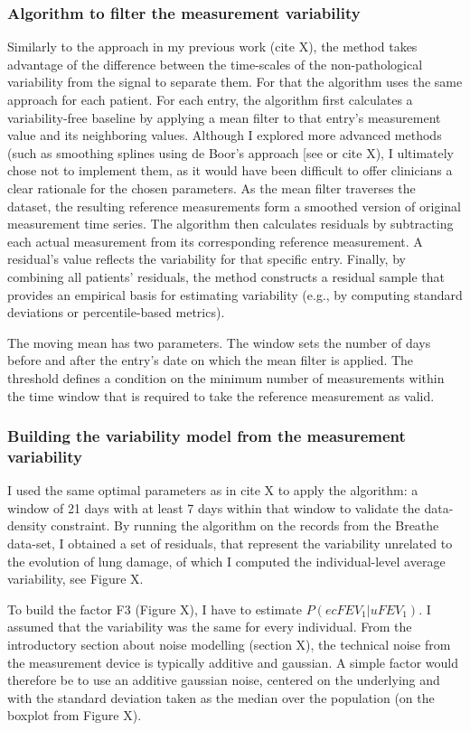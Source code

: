 \subsubsection{Algorithm to filter the measurement variability}
Similarly to the approach in my previous work (cite X), the method takes advantage of the difference between the time-scales of the non-pathological variability from the signal to separate them. For that the algorithm uses the same approach for each patient.
For each entry, the algorithm first calculates a variability-free baseline by applying a mean filter to that entry’s measurement value and its neighboring values. Although I explored more advanced methods (such as smoothing splines using de Boor’s approach [see \cite{imoto_2003} or cite X), I ultimately chose not to implement them, as it would have been difficult to offer clinicians a clear rationale for the chosen parameters.  As the mean filter traverses the dataset, the resulting reference measurements form a smoothed version of original measurement time series. The algorithm then calculates residuals by subtracting each actual measurement from its corresponding reference measurement. A residual's value reflects the variability for that specific entry. Finally, by combining all patients’ residuals, the method constructs a residual sample that provides an empirical basis for estimating \F variability (e.g., by computing standard deviations or percentile-based metrics).

The moving mean has two parameters. The window sets the number of days before and after the entry’s date on which the mean filter is applied. The threshold defines a condition on the minimum number of measurements within the time window that is required to take the reference measurement as valid.

\subsubsection{Building the variability model from the measurement variability}
I used the same optimal parameters as in cite X to apply the algorithm: a window of 21 days with at least 7 days within that window to validate the data-density constraint. By running the algorithm on the \F records from the Breathe data-set, I obtained a set of residuals, that represent the variability unrelated to the evolution of lung damage, of which I computed the individual-level average variability, see Figure X.

To build the factor F3 (Figure X), I have to estimate $P(ecF\!EV_1 | uF\!EV_1)$. I assumed that the variability was the same for every individual. 
From the introductory section about noise modelling (section X), the technical noise from the measurement device is typically additive and gaussian. A simple factor would therefore be to use an additive gaussian noise, centered on the underlying \F and with the standard deviation taken as the median over the population (on the boxplot from Figure X). 

